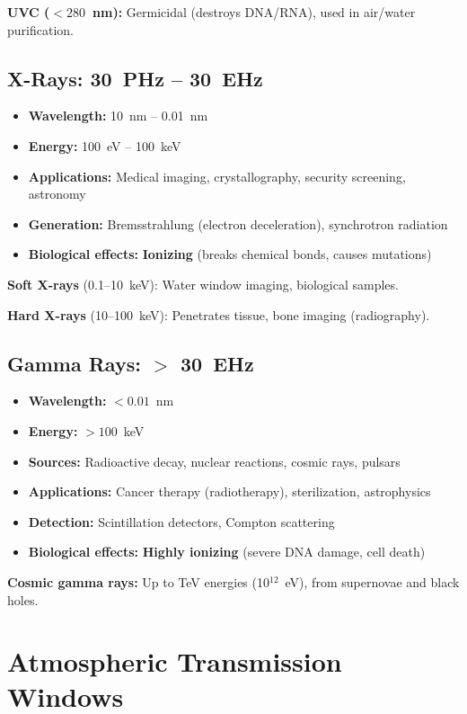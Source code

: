 \textbf{UVC ($< 280$~nm):} Germicidal (destroys DNA/RNA), used in air/water purification.

\subsection{X-Rays: 30~PHz -- 30~EHz}

\begin{itemize}
\item \textbf{Wavelength:} 10~nm -- 0.01~nm
\item \textbf{Energy:} 100~eV -- 100~keV
\item \textbf{Applications:} Medical imaging, crystallography, security screening, astronomy
\item \textbf{Generation:} Bremsstrahlung (electron deceleration), synchrotron radiation
\item \textbf{Biological effects:} \textbf{Ionizing} (breaks chemical bonds, causes mutations)
\end{itemize}

\textbf{Soft X-rays} (0.1--10~keV): Water window imaging, biological samples.

\textbf{Hard X-rays} (10--100~keV): Penetrates tissue, bone imaging (radiography).

\subsection{Gamma Rays: $>$ 30~EHz}

\begin{itemize}
\item \textbf{Wavelength:} $< 0.01$~nm
\item \textbf{Energy:} $> 100$~keV
\item \textbf{Sources:} Radioactive decay, nuclear reactions, cosmic rays, pulsars
\item \textbf{Applications:} Cancer therapy (radiotherapy), sterilization, astrophysics
\item \textbf{Detection:} Scintillation detectors, Compton scattering
\item \textbf{Biological effects:} \textbf{Highly ionizing} (severe DNA damage, cell death)
\end{itemize}

\textbf{Cosmic gamma rays:} Up to TeV energies (10$^{12}$~eV), from supernovae and black holes.

\section{Atmospheric Transmission Windows}

